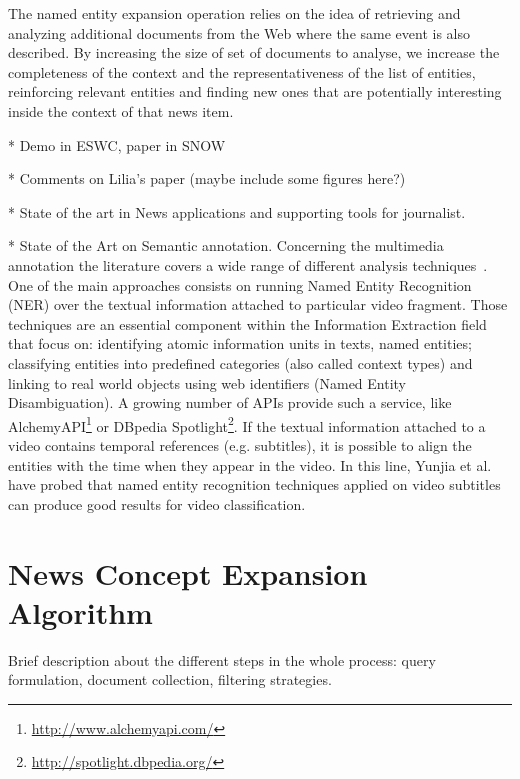 \documentclass{llncs}
\begin{document}
The named entity expansion operation relies on the idea of retrieving and analyzing additional documents from the Web where the same event is also described. By increasing the size of set of documents to analyse, we increase the completeness of the context and the representativeness of the list of entities, reinforcing relevant entities and finding new ones that are potentially interesting inside the context of that news item.

* Demo in ESWC, paper in SNOW

* Comments on Lilia's paper (maybe include some figures here?)

* State of the art in News applications and supporting tools for journalist.

* State of the Art on Semantic annotation.
Concerning the multimedia annotation the literature covers a wide range of different analysis techniques~\cite{ballan2011event}. One of the main approaches consists on running Named Entity Recognition (NER) over the textual information attached to particular video fragment. Those techniques are an essential component within the Information Extraction field that focus on: identifying atomic information units in texts, named entities; classifying entities into predefined categories (also called context types) and linking to real world objects using web identifiers (Named Entity Disambiguation). A growing number of APIs provide such a service, like AlchemyAPI\footnote{\fontsize{8pt}{1em}\selectfont \url{http://www.alchemyapi.com/}} or DBpedia Spotlight\footnote{\fontsize{8pt}{1em}\selectfont \url{http://spotlight.dbpedia.org/}}. If the textual information attached to a video contains temporal references (e.g. subtitles), it is possible to align the entities with the time when they appear in the video. In this line, Yunjia et al.~\cite{yunjia2013} have probed that named entity recognition techniques applied on video subtitles can produce good results for video classification. 

\section{News Concept Expansion Algorithm}
\label{sec:ConceptExpansion}

Brief description about the different steps in the whole process: query formulation, document collection, filtering strategies.
\end{document}
